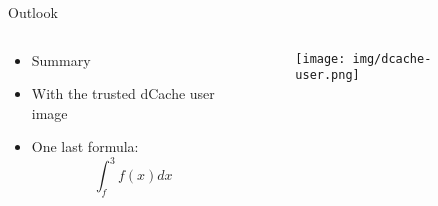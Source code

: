 \documentclass[english, presentation, aspectratio=169, 14pt]{beamer} %
\begin{document}
	\begin{frame}{Outlook}
		\vspace{-2mm}
		\begin{columns}
			\begin{column}{0.5\textwidth}
				\begin{itemize}
					\item Summary
					\item With the trusted dCache user image
					\item One last formula: $$\int_{f}^3 f(x) dx$$
				\end{itemize}
			\end{column}
			\hspace{-4mm}
			\begin{column}{0.5\textwidth}
				\begin{figure}
					\texttt{[image: img/dcache-user.png]}
				\end{figure}
			\end{column}
		\end{columns}
	\end{frame}
\end{document}
